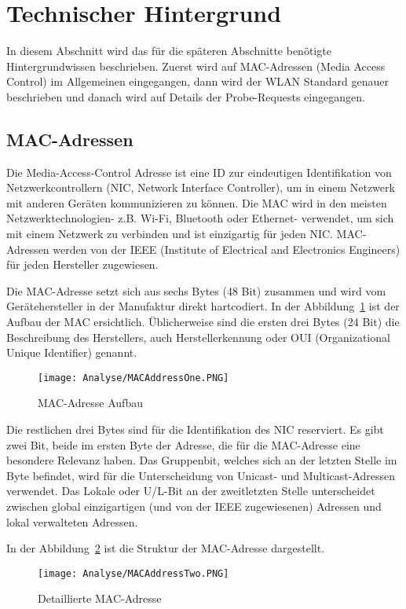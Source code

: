 \section{Technischer Hintergrund}
In diesem Abschnitt wird das für die späteren Abschnitte benötigte 
Hintergrundwissen beschrieben. Zuerst wird auf MAC-Adressen (Media Access Control) 
im Allgemeinen eingegangen, dann wird der WLAN Standard genauer beschrieben 
und danach wird auf Details der Probe-Requests eingegangen.

\subsection{MAC-Adressen}
Die Media-Access-Control Adresse ist eine ID zur eindeutigen Identifikation
von Netzwerkcontrollern (NIC, Network Interface Controller), um in einem 
Netzwerk mit anderen Geräten kommunizieren zu können.
Die MAC wird in den meisten Netzwerktechnologien- z.B. Wi-Fi, Bluetooth oder 
Ethernet- verwendet, um sich mit einem Netzwerk zu verbinden und ist einzigartig
für jeden NIC. MAC-Adressen werden von der IEEE (Institute of Electrical and Electronics
Engineers) für jeden Hersteller zugewiesen.

Die MAC-Adresse setzt sich aus sechs Bytes (48 Bit) zusammen und wird vom 
Gerätehersteller in der Manufaktur direkt hartcodiert. 
In der Abbildung~\ref{figure:macadresseaufbau} ist der Aufbau der MAC ersichtlich.
Üblicherweise sind die ersten drei Bytes (24 Bit) die Beschreibung des 
Herstellers, auch Herstellerkennung oder OUI (Organizational Unique Identifier)
genannt.  

\begin{figure}[h!]
	\centering
	\texttt{[image: Analyse/MACAddressOne.PNG]}
	\caption{MAC-Adresse Aufbau
	\label{figure:macadresseaufbau}}
\end{figure}
Die restlichen drei Bytes sind für die Identifikation des NIC reserviert.
Es gibt zwei Bit, beide im ersten Byte der Adresse,
die für die MAC-Adresse eine besondere Relevanz haben.
Das Gruppenbit, welches sich an der letzten Stelle im Byte befindet, 
wird für die Unterscheidung von Unicast- und Multicast-Adressen verwendet.
Das Lokale oder U/L-Bit an der zweitletzten Stelle unterscheidet zwischen
global einzigartigen (und von der IEEE zugewiesenen) Adressen und lokal 
verwalteten Adressen.

\clearpage 

In der Abbildung~\ref{figure:macadressedetail} ist die Struktur der MAC-Adresse dargestellt.
\begin{figure}[h!]
	\centering
	\texttt{[image: Analyse/MACAddressTwo.PNG]}
	\caption{Detaillierte MAC-Adresse
	\label{figure:macadressedetail}}
\end{figure}


